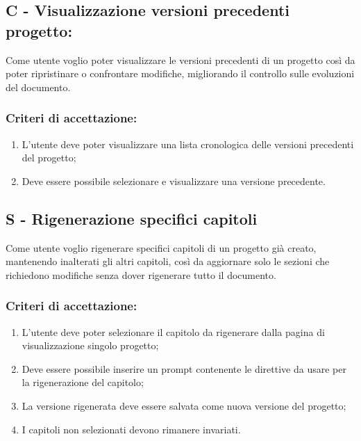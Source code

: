 \vspace{0.5cm}

\subsection*{C - Visualizzazione versioni precedenti progetto:}

\noindent Come utente voglio poter visualizzare le versioni precedenti di un progetto così da poter ripristinare o confrontare modifiche, migliorando il controllo sulle evoluzioni del documento.

\subsubsection*{Criteri di accettazione:}

\begin{enumerate}
    \item L'utente deve poter visualizzare una lista cronologica delle versioni precedenti del progetto;
    \item Deve essere possibile selezionare e visualizzare una versione precedente.
\end{enumerate}

\vspace{0.5cm}
\pagebreak
\subsection*{S - Rigenerazione specifici capitoli}

\noindent Come utente voglio rigenerare specifici capitoli di un progetto già creato, mantenendo inalterati gli altri capitoli, così da aggiornare solo le sezioni che richiedono modifiche senza dover rigenerare tutto il documento.

\subsubsection*{Criteri di accettazione:}

\begin{enumerate}
    \item L'utente deve poter selezionare il capitolo da rigenerare dalla pagina di visualizzazione singolo progetto;
    \item Deve essere possibile inserire un \gls{prompt} contenente le direttive da usare per la rigenerazione del capitolo;
    \item La versione rigenerata deve essere salvata come nuova versione del progetto;
    \item I capitoli non selezionati devono rimanere invariati.
\end{enumerate}

